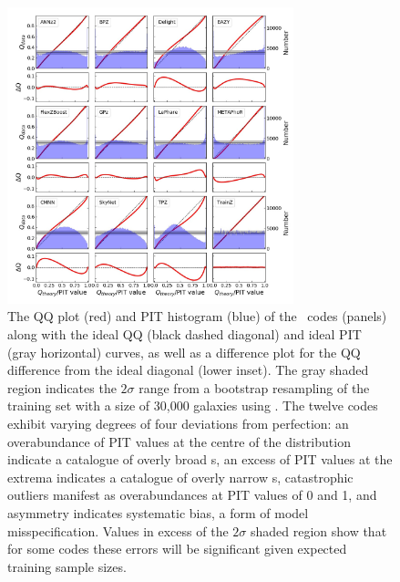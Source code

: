 \begin{figure}
\centering
\includegraphics[width=0.74\textwidth]{fig/PITANDQQplot_12codes_withsigmaband_biglabels_crop.jpg}
\caption{The QQ plot (red) and PIT histogram (blue) of the \pzpdf\ codes (panels) along with the ideal QQ (black dashed diagonal) and ideal PIT (gray horizontal) curves, as well as a difference plot for the QQ difference from the ideal diagonal (lower inset).
The gray shaded region indicates the $2 \sigma$ range from a bootstrap resampling of the training set with a size of 30,000 galaxies using \trainz.
The twelve codes exhibit varying degrees of four deviations from perfection: an overabundance of PIT values at the centre of the distribution indicate a catalogue of overly broad \pzpdf s, an excess of PIT values at the extrema indicates a catalogue of overly narrow \pzpdf s, catastrophic outliers manifest as overabundances at PIT values of 0 and 1, and asymmetry indicates systematic bias, a form of model misspecification.
Values in excess of the $2\sigma$ shaded region show that for some codes these errors will be significant given expected training sample sizes.}
\label{fig:pitqq}
\end{figure}

